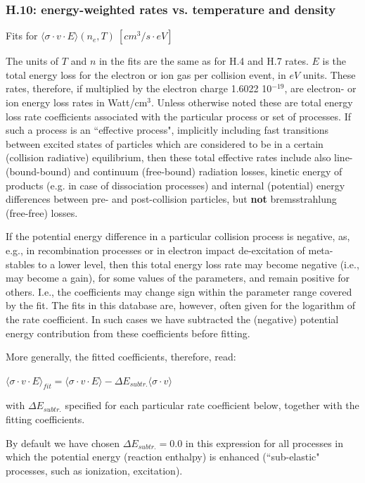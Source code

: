 \documentclass[12pt,dvipdfmx]{article}
\begin{document}
\subsubsection{H.10: energy-weighted rates vs. temperature and density}\label{sec1.3.10}
Fits for $\langle\sigma \cdot v \cdot E \rangle (n_e,T) \ [cm^3/s \cdot eV]$

The units of $T$ and $n$ in the fits are the same as for H.4 and H.7
rates. $E$ is the total energy loss for the electron or ion gas per
collision event, in $eV$ units. These rates, therefore, if multiplied by the
electron charge 1.6022 10$^{-19}$, are electron- or ion energy loss
rates in Watt/cm$^3$. Unless otherwise noted these are total energy
loss rate coefficients associated with the particular process or set of processes. If
such a process is an ``effective process", implicitly including fast
transitions between excited states of particles which are considered
to be in a certain (collision radiative) equilibrium, then these
total effective rates include also line- (bound-bound) and continuum
(free-bound) radiation losses, kinetic energy of products (e.g. in
case of dissociation processes) and internal (potential) energy
differences between pre- and post-collision particles, but {\bf not}
bremsstrahlung (free-free) losses.

If the potential energy difference in a particular collision process
is negative, as, e.g., in recombination processes
or in electron impact de-excitation of meta-stables to a lower level,
then this total energy loss rate
may become negative (i.e., may become a gain), for some values of the parameters,
and remain positive for others.
I.e., the coefficients may change sign within the parameter
range covered by the fit.
The fits in this database are, however, often given for the logarithm of the
rate coefficient. In such cases we have subtracted the (negative) potential energy
contribution from these coefficients before fitting.

More generally, the fitted coefficients, therefore, read:

$\langle\sigma \cdot v \cdot E \rangle_{fit} = \langle\sigma \cdot v \cdot E \rangle - \Delta E_{subtr.} \langle\sigma \cdot v \rangle$

with $\Delta E_{subtr.} $ specified for each particular rate coefficient below, together
with the fitting coefficients.

By default we have chosen $\Delta E_{subtr.} = 0.0$ in this expression
for all processes in which the potential energy (reaction enthalpy) is
enhanced (``sub-elastic" processes, such as ionization, excitation).
\end{document}
